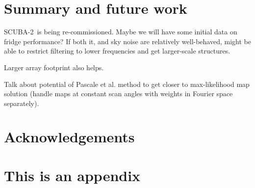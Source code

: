 \documentclass[useAMS,usenatbib,nofootinbib]{mn2e}
\newcommand{\scuba}{SCUBA-2}
\begin{document}
\section{Summary and future work}
\label{sec:summary}

\scuba\ is being re-commissioned. Maybe we will have some initial data
on fridge performance? If both it, and sky noise are relatively
well-behaved, might be able to restrict filtering to lower frequencies
and get larger-scale structures.

Larger array footprint also helps.

Talk about potential of Pascale et al. method to get closer to
max-likelihood map solution (handle maps at constant scan angles with
weights in Fourier space separately).

\section{Acknowledgements}





\appendix
\section[]{This is an appendix}
\end{document}
